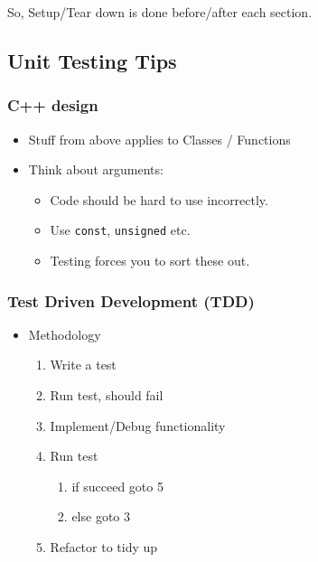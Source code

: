 So, Setup/Tear down is done before/after each section.

\subsection{Unit Testing Tips}\label{unit-testing-tips}

\subsubsection{C++ design}\label{c-design}

\begin{itemize}
\itemsep1pt\parskip0pt
\item
  Stuff from above applies to Classes / Functions
\item
  Think about arguments:

  \begin{itemize}
  \itemsep1pt\parskip0pt
  \item
    Code should be hard to use incorrectly.
  \item
    Use \texttt{const}, \texttt{unsigned} etc.
  \item
    Testing forces you to sort these out.
  \end{itemize}
\end{itemize}

\subsubsection{Test Driven Development
(TDD)}\label{test-driven-development-tdd}

\begin{itemize}
\itemsep1pt\parskip0pt
\item
  Methodology

  \begin{enumerate}
  \def\labelenumi{\arabic{enumi}.}
  \itemsep1pt\parskip0pt
  \item
    Write a test
  \item
    Run test, should fail
  \item
    Implement/Debug functionality
  \item
    Run test

    \begin{enumerate}
    \def\labelenumii{\arabic{enumii}.}
    \itemsep1pt\parskip0pt
    \item
      if succeed goto 5
    \item
      else goto 3
    \end{enumerate}
  \item
    Refactor to tidy up
  \end{enumerate}
\end{itemize}

